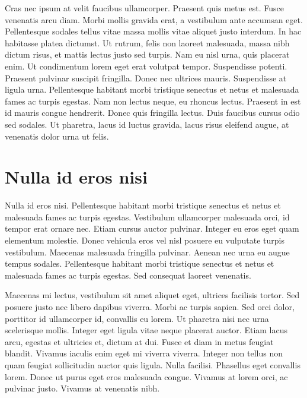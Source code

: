 Cras nec ipsum at velit faucibus ullamcorper.
Praesent quis metus est.
Fusce venenatis arcu diam.
Morbi mollis gravida erat, a vestibulum ante accumsan eget.
Pellentesque sodales tellus vitae massa mollis vitae aliquet justo interdum.
In hac habitasse platea dictumst.
Ut rutrum, felis non laoreet malesuada, massa nibh dictum risus, et mattis lectus justo sed turpis.
Nam eu nisl urna, quis placerat enim.
Ut condimentum lorem eget erat volutpat tempor.
Suspendisse potenti.
Praesent pulvinar suscipit fringilla.
Donec nec ultrices mauris.
Suspendisse at ligula urna.
Pellentesque habitant morbi tristique senectus et netus et malesuada fames ac turpis egestas.
Nam non lectus neque, eu rhoncus lectus.
Praesent in est id mauris congue hendrerit.
Donec quis fringilla lectus.
Duis faucibus cursus odio sed sodales.
Ut pharetra, lacus id luctus gravida, lacus risus eleifend augue, at venenatis dolor urna ut felis.

\section{Nulla id eros nisi}
Nulla id eros nisi.
Pellentesque habitant morbi tristique senectus et netus et malesuada fames ac turpis egestas.
Vestibulum ullamcorper malesuada orci, id tempor erat ornare nec.
Etiam cursus auctor pulvinar.
Integer eu eros eget quam elementum molestie.
Donec vehicula eros vel nisl posuere eu vulputate turpis vestibulum.
Maecenas malesuada fringilla pulvinar.
Aenean nec urna eu augue tempus sodales.
Pellentesque habitant morbi tristique senectus et netus et malesuada fames ac turpis egestas.
Sed consequat laoreet venenatis.

Maecenas mi lectus, vestibulum sit amet aliquet eget, ultrices facilisis tortor.
Sed posuere justo nec libero dapibus viverra.
Morbi ac turpis sapien.
Sed orci dolor, porttitor id ullamcorper id, convallis eu lorem.
Ut pharetra nisi nec urna scelerisque mollis.
Integer eget ligula vitae neque placerat auctor.
Etiam lacus arcu, egestas et ultricies et, dictum at dui.
Fusce et diam in metus feugiat blandit.
Vivamus iaculis enim eget mi viverra viverra.
Integer non tellus non quam feugiat sollicitudin auctor quis ligula.
Nulla facilisi.
Phasellus eget convallis lorem.
Donec ut purus eget eros malesuada congue.
Vivamus at lorem orci, ac pulvinar justo.
Vivamus at venenatis nibh.

